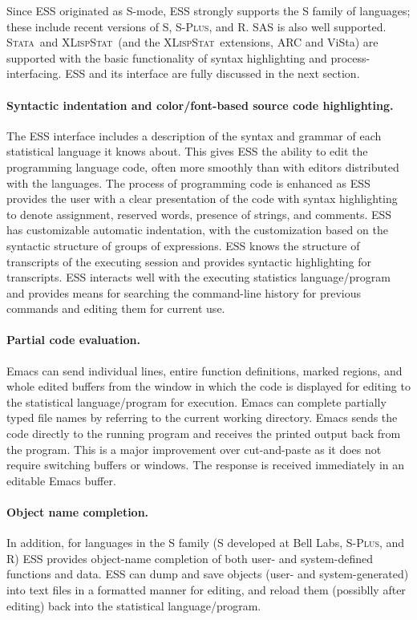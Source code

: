 \documentclass{article}
\newcommand*{\Splus}{\textsc{S-Plus}}
\newcommand*{\XLispStat}{\textsc{XLispStat}}
\newcommand*{\Stata}{\textsc{Stata}}
\begin{document}
Since ESS originated as S-mode, ESS strongly supports the S family of
languages; these include recent versions of S, \Splus, and R.  SAS is
also well supported.  \Stata\ and \XLispStat\ (and the \XLispStat\ 
extensions, ARC and ViSta) are supported with the basic functionality
of syntax highlighting and process-interfacing.  ESS and its interface
are fully discussed in the next section.

\paragraph{Syntactic indentation and color/font-based source code
  highlighting.}
The ESS interface includes a description of the syntax and grammar of
each statistical language it knows about.  This gives ESS the ability
to edit the programming language code, often more smoothly than with
editors distributed with the languages.  The process of programming
code is enhanced as ESS provides the user with a clear presentation of
the code with syntax highlighting to denote assignment, reserved
words, presence of strings, and comments.  ESS has customizable
automatic indentation, with the customization based on the syntactic
structure of groups of expressions.  ESS knows the structure of
transcripts of the executing session and provides syntactic highlighting
for transcripts.  ESS interacts well with the executing statistics
language/program and
provides means for searching the command-line history for previous
commands and editing them for current use.

\paragraph{Partial code evaluation.}
Emacs can send individual lines, entire function definitions, marked
regions, and whole edited buffers from the window in which the code is
displayed for editing to the statistical language/program for
execution.  Emacs can complete partially typed file names by referring
to the current working directory.  Emacs sends the code directly to
the running program and receives the printed output back from the
program.  This is a major improvement over cut-and-paste as it does 
not require switching buffers or windows.  The response is
received immediately in an editable Emacs buffer.

\paragraph{Object name completion.}
In addition, for languages in the S family (S 
developed at Bell Labs, \Splus, and R)
ESS provides object-name completion of both user- and system-defined
functions and data.  ESS can dump and save
objects (user- and system-generated) into text files in a formatted
manner for editing, and reload them (possiblly after editing) back
into the statistical language/program.
\end{document}
